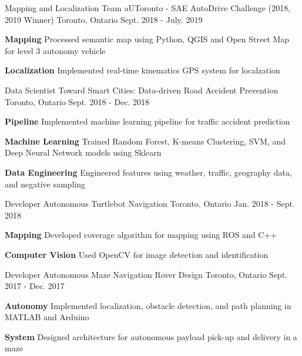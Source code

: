 \begin{cventries}
	\cventry
	{Mapping and Localization Team}
	{aUToronto - SAE AutoDrive Challenge (2018, 2019 Winner)}
	{Toronto, Ontario}
	{Sept. 2018 - July. 2019}
	{
		\begin{cvitems}
			\item {\textbf{Mapping} Processed semantic map using Python, QGIS and Open Street Map for level 3 autonomy vehicle}
			\item {\textbf{Localization} Implemented real-time kinematics GPS system for localzation}
		\end{cvitems}
	}	
	\cventry
	{Data Scientist}
	{Toward Smart Cities: Data-driven Road Accident Prevention}
	{Toronto, Ontario}
	{Sept. 2018 - Dec. 2018}
	{
		\begin{cvitems}
			\item {\textbf{Pipeline} Implemented machine learning pipeline for traffic accident prediction}
			\item {\textbf{Machine Learning} Trained Random Forest, K-means Clustering, SVM, and Deep Neural Network models using Sklearn}
			\item {\textbf{Data Engineering} Engineered features using weather, traffic, geography data, and negative sampling}
		\end{cvitems}
	}
	\cventry
	{Developer}
	{Autonomous Turtlebot Navigation}
	{Toronto, Ontario}
	{Jan. 2018 - Sept. 2018}
	{
		\begin{cvitems}
			\item {\textbf{Mapping} Developed coverage algorithm for mapping using ROS and C++}
			\item {\textbf{Computer Vision} Used OpenCV for image detection and identification}
		\end{cvitems}
	}
	\cventry
	{Developer}
	{Autonomous Maze Navigation Rover Design}
	{Toronto, Ontario}
	{Sept. 2017 - Dec. 2017}
	{
		\begin{cvitems}
			\item { \textbf{Autonomy} Implemented localization, obstacle detection, and path planning in MATLAB and Arduino}
			\item { \textbf{System} Designed architecture for autonomous payload pick-up and delivery in a maze}
		\end{cvitems}
	}
\end{cventries}

